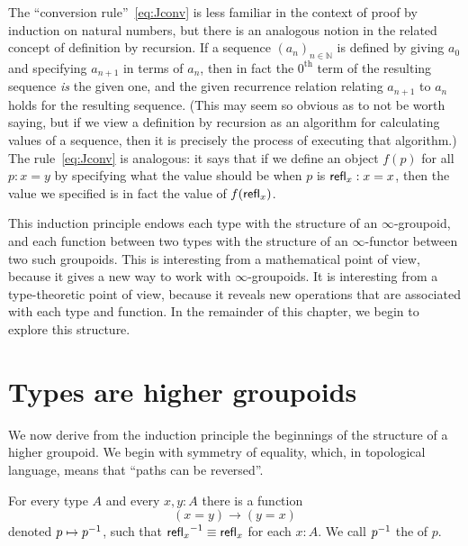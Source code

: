 The ``conversion rule''~\eqref{eq:Jconv} is less familiar in the context of proof by induction on natural numbers, but there is an analogous notion in the related concept of definition by recursion.
If a sequence $(a_n)_{n\in \mathbb{N}}$ is defined by giving $a_0$ and specifying $a_{n+1}$ in terms of $a_n$, then in fact the $0^{\mathrm{th}}$ term of the resulting sequence \emph{is} the given one, and the given recurrence relation relating $a_{n+1}$ to $a_n$ holds for the resulting sequence.
(This may seem so obvious as to not be worth saying, but if we view a definition by recursion as an algorithm for calculating values of a sequence, then it is precisely the process of executing that algorithm.)
The rule~\eqref{eq:Jconv} is analogous: it says that if we define an object $f(p)$ for all $p:x=y$ by specifying what the value should be when $p$ is $\mathsf{refl}_{x}:x=x$, then the value we specified is in fact the value of $f(\mathsf{refl}_{x})$.

This induction principle endows each type with the structure of an $\infty$-groupoid, and each function between two types with the structure of an $\infty$-functor between two such groupoids.  This is interesting from a mathematical point of view, because it gives a new way to work with
$\infty$-groupoids.  It is interesting from a type-theoretic point of view, because it reveals new operations that are associated with each type and function.  In the remainder of this chapter, we begin to explore this structure.

\section{Types are higher groupoids}
\label{sec:equality}

%
%
%
We now derive from the induction principle the beginnings of the structure of a higher groupoid.
We begin with symmetry of equality, which, in topological language, means that ``paths can be reversed''.

\begin{lem}\label{lem:opp}
  For every type $A$ and every $x,y:A$ there is a function
  \begin{equation*}
    (x= y)\to(y= x)
  \end{equation*}
  denoted $p\mapsto \mathord{{p}^{-1}}$, such that $\mathord{{\mathsf{refl}_{x}}^{-1}}\equiv\mathsf{refl}_{x}$ for each $x:A$.
  We call $\mathord{{p}^{-1}}$ the  of $p$.
\end{lem}

